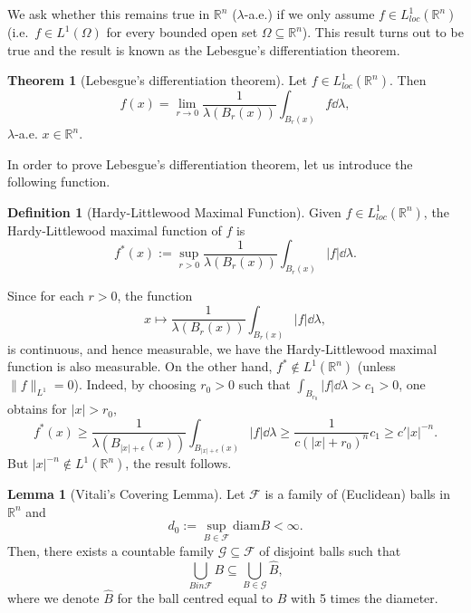 \documentclass[
]{article}
\theoremstyle{definition}
\newtheorem{theorem}{Theorem}
\theoremstyle{definition}
\newtheorem{definition}{Definition}[section]
\newtheorem{lemma}{Lemma}[section]
\begin{document}
We ask whether this remains true in \(\mathbb{R}^n\) (\(\lambda\)-a.e.)
if we only assume \(f \in L_{loc}^1(\mathbb{R}^n)\)
(i.e.~\(f \in L^1(\Omega)\) for every bounded open set
\(\Omega \subseteq \mathbb{R}^n\)). This result turns out to be true and
the result is known as the Lebesgue's differentiation theorem.

\begin{theorem}[Lebesgue's differentiation theorem]
  Let \(f \in L_{loc}^1(\mathbb{R}^n)\). Then 
  \[f(x) = \lim_{r \to 0} \frac{1}{\lambda(B_r(x))} \int_{B_r(x)} f \dd \lambda,\]
  \(\lambda\)-a.e. \(x \in \mathbb{R}^n\).
\end{theorem}

In order to prove Lebesgue's differentiation theorem, let us introduce
the following function.

\begin{definition}[Hardy-Littlewood Maximal Function]
  Given \(f \in L_{loc}^1(\mathbb{R}^n)\), the Hardy-Littlewood maximal function 
  of \(f\) is
  \[f^*(x) := \sup_{r > 0} \frac{1}{\lambda(B_r(x))} \int_{B_r(x)}|f| \dd\lambda.\]
\end{definition}

Since for each \(r > 0\), the function
\[x \mapsto \frac{1}{\lambda(B_r(x))} \int_{B_r(x)}|f| \dd\lambda,\] is
continuous, and hence measurable, we have the Hardy-Littlewood maximal
function is also measurable. On the other hand,
\(f^* \not\in L^1(\mathbb{R}^n)\) (unless \(\|f\|_{L^1} = 0\)). Indeed,
by choosing \(r_0 > 0\) such that
\(\int_{B_{r_0}} |f| \dd \lambda > c_1 > 0\), one obtains for
\(|x| > r_0\),
\[f^*(x) \ge \frac{1}{\lambda(B_{|x| + \epsilon}(x))}\int_{B_{|x| + \epsilon}(x)} |f| \dd \lambda \ge 
  \frac{1}{c(|x| + r_0)^n}c_1 \ge c' |x|^{-n}.\] But
\(|x|^{-n} \not\in L^1(\mathbb{R}^n)\), the result follows.

\begin{lemma}[Vitali's Covering Lemma]
  Let \(\mathcal{F}\) is a family of (Euclidean) balls in \(\mathbb{R}^n\) and 
  \[d_0 := \sup_{B \in \mathcal{F}} \text{diam} B < \infty.\]
  Then, there exists a countable family \(\mathcal{G} \subseteq \mathcal{F}\) 
  of disjoint balls such that 
  \[\bigcup_{B in \mathcal{F}} B \subseteq \bigcup_{B \in \mathcal{G}} \hat B,\]
  where we denote \(\hat B\) for the ball centred equal to \(B\) with 5 times the 
  diameter.
\end{lemma}
\proof
\end{document}
